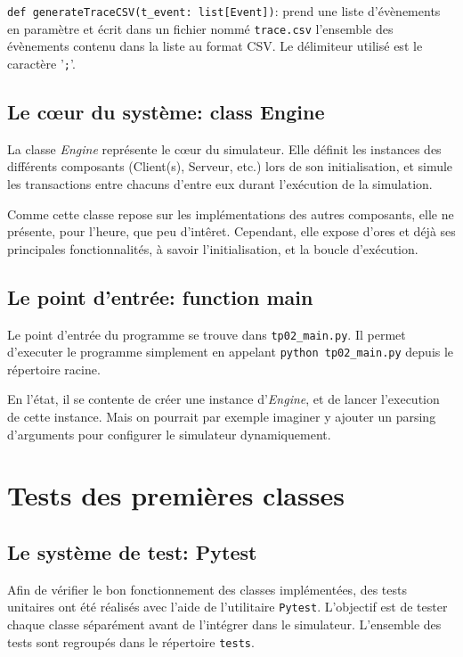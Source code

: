 \documentclass[11pt,a4paper]{article}
\begin{document}
\lstinline|def generateTraceCSV(t_event: list[Event])|: prend une liste d'évènements en paramètre et écrit dans un fichier nommé \lstinline|trace.csv| l'ensemble des évènements contenu dans la liste au format CSV. Le délimiteur utilisé est le caractère '\lstinline|;|'.

\bigskip

\subsection{Le cœur du système: class Engine}

La classe \emph{Engine} représente le cœur du simulateur. Elle définit les instances des différents composants (Client(s), Serveur, etc.) lors de son initialisation, et simule les transactions entre chacuns d'entre eux durant l'exécution de la simulation.

Comme cette classe repose sur les implémentations des autres composants, elle ne présente, pour l'heure, que peu d'intêret. Cependant, elle expose d'ores et déjà ses principales fonctionnalités, à savoir l'initialisation, et la boucle d'exécution.

\bigskip

\subsection{Le point d'entrée: function main}

Le point d'entrée du programme se trouve dans \lstinline|tp02_main.py|. Il permet d'executer le programme simplement en appelant \lstinline|python tp02_main.py| depuis le répertoire racine.

En l'état, il se contente de créer une instance d'\emph{Engine},
et de lancer l'execution de cette instance. Mais on pourrait par exemple imaginer y ajouter un parsing d'arguments pour configurer le simulateur dynamiquement.

\bigskip
\bigskip
\bigskip

\section{Tests des premières classes}
\subsection{Le système de test: Pytest}
Afin de vérifier le bon fonctionnement des classes implémentées, des tests unitaires ont été réalisés avec l'aide de l'utilitaire \lstinline|Pytest|. L'objectif est de tester chaque classe séparément avant de l'intégrer dans le simulateur. L'ensemble des tests sont regroupés dans le répertoire \lstinline|tests|.
\end{document}
